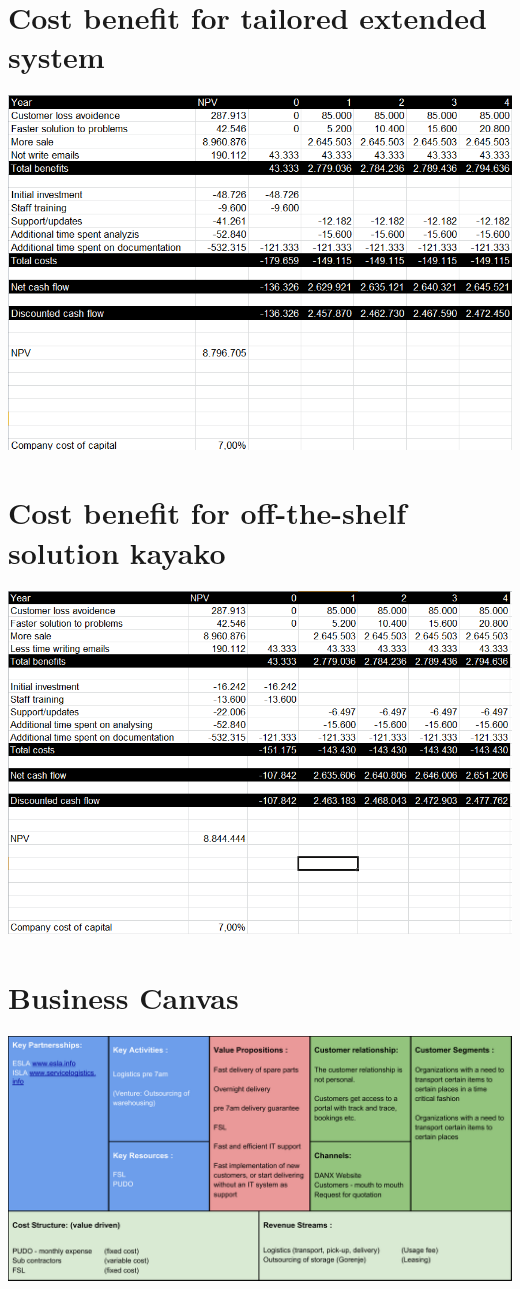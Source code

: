 \section{Cost benefit for tailored extended system}
\label{sec:cost_tailored_extended}
\includegraphics[width=\textwidth]{img/CostBenefit_TailoredExtended}


\section{Cost benefit for off-the-shelf solution kayako}
\label{sec:cost_off-the-shelf}
\includegraphics[width=\textwidth]{img/CostBenefit_Off-the-shelf}

\section{Business Canvas}
\label{sec:business_canvas}
\includegraphics[angle=270, scale=0.85]{img/Business_Canvas.pdf}
